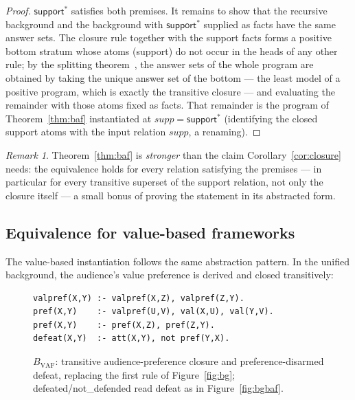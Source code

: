 \documentclass[review,12pt]{elsarticle}
\theoremstyle{definition}
\theoremstyle{remark}
\newtheorem{remark}{Remark}
\newcommand{\pred}[1]{\textsf{#1}}
\begin{document}
\begin{proof}
$\pred{support}^{*}$ satisfies both premises. It remains to show that the
recursive background and the background with $\pred{support}^{*}$ supplied as
facts have the same answer sets. The closure rule together with the
\pred{support} facts forms a positive bottom stratum whose atoms
(\pred{support}) do not occur in the heads of any other rule; by the splitting
theorem~\citep{lifschitz1994}, the answer sets of the whole program are
obtained by taking the unique answer set of the bottom --- the least model of a
positive program, which is exactly the transitive closure --- and evaluating
the remainder with those atoms fixed as facts. That remainder is the program
of Theorem~\ref{thm:baf} instantiated at $\mathit{supp}=\pred{support}^{*}$
(identifying the closed \pred{support} atoms with the input relation
$\mathit{supp}$, a renaming).
\end{proof}

\begin{remark}
Theorem~\ref{thm:baf} is \emph{stronger} than the claim
Corollary~\ref{cor:closure} needs: the equivalence holds for every relation
satisfying the premises --- in particular for every transitive superset of the
support relation, not only the closure itself --- a small bonus of proving the
statement in its abstracted form.
\end{remark}

\subsection{Equivalence for value-based frameworks}
\label{sec:thmvaf}

The value-based instantiation follows the same abstraction pattern. In the
unified background, the audience's value preference is derived and closed
transitively:

\begin{figure}[h]
\centering
\small
\begin{minipage}{0.72\linewidth}
\begin{verbatim}
valpref(X,Y) :- valpref(X,Z), valpref(Z,Y).
pref(X,Y)    :- valpref(U,V), val(X,U), val(Y,V).
pref(X,Y)    :- pref(X,Z), pref(Z,Y).
defeat(X,Y)  :- att(X,Y), not pref(Y,X).
\end{verbatim}
\end{minipage}
\caption{$B_{\mathrm{VAF}}$: transitive audience-preference closure and
preference-disarmed defeat, replacing the first rule of Figure~\ref{fig:bg};
\pred{defeated}/\pred{not\_defended} read \pred{defeat} as in
Figure~\ref{fig:bgbaf}.}
\label{fig:bgvaf}
\end{figure}
\end{document}
